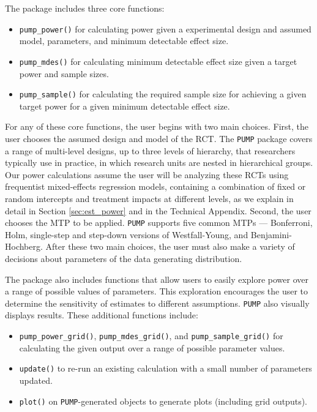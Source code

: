 \documentclass{article}
\providecommand{\tightlist}{%
  \setlength{\itemsep}{0pt}\setlength{\parskip}{0pt}}
\begin{document}
The package includes three core functions:

\begin{itemize}
\tightlist
\item
  \texttt{pump\_power()} for calculating power given a experimental
  design and assumed model, parameters, and minimum detectable effect
  size.
\item
  \texttt{pump\_mdes()} for calculating minimum detectable effect size
  given a target power and sample sizes.
\item
  \texttt{pump\_sample()} for calculating the required sample size for
  achieving a given target power for a given minimum detectable effect
  size.
\end{itemize}

For any of these core functions, the user begins with two main choices.
First, the user chooses the assumed design and model of the RCT. The
\texttt{PUMP} package covers a range of multi-level designs, up to three
levels of hierarchy, that researchers typically use in practice, in
which research units are nested in hierarchical groups. Our power
calculations assume the user will be analyzing these RCTs using
frequentist mixed-effects regression models, containing a combination of
fixed or random intercepts and treatment impacts at different levels, as
we explain in detail in Section \ref{sec:est_power} and in the Technical
Appendix. Second, the user chooses the MTP to be applied. \texttt{PUMP}
supports five common MTPs --- Bonferroni, Holm, single-step and
step-down versions of Westfall-Young, and Benjamini-Hochberg. After
these two main choices, the user must also make a variety of decisions
about parameters of the data generating distribution.

The package also includes functions that allow users to easily explore
power over a range of possible values of parameters. This exploration
encourages the user to determine the sensitivity of estimates to
different assumptions. \texttt{PUMP} also visually displays results.
These additional functions include:

\begin{itemize}
\tightlist
\item
  \texttt{pump\_power\_grid()}, \texttt{pump\_mdes\_grid()}, and
  \texttt{pump\_sample\_grid()} for calculating the given output over a
  range of possible parameter values.
\item
  \texttt{update()} to re-run an existing calculation with a small
  number of parameters updated.
\item
  \texttt{plot()} on \texttt{PUMP}-generated objects to generate plots
  (including grid outputs).
\end{itemize}
\end{document}

